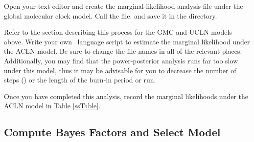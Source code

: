 {\begin{framed}
Open your text editor and create the marginal-likelihood analysis file under the global molecular clock model. Call the file: {\textcolor{red}{}} and save it in the  directory.
\end{framed}}

Refer to the section describing this process for the GMC and UCLN models above.
Write your own \Rev~language script to estimate the marginal likelihood under the ACLN model. 
Be sure to change the file names in all of the relevant places.
Additionally, you may find that the power-posterior analysis runs far too slow under this model, thus it may be advisable for you to decrease the number of steps () or the length of the burn-in period or run.

{\begin{framed}
Once you have completed this analysis, record the marginal likelihoods under the ACLN model in Table \ref{ssTable}.
\end{framed}}

\FloatBarrier
\subsection{Compute Bayes Factors and Select Model}


